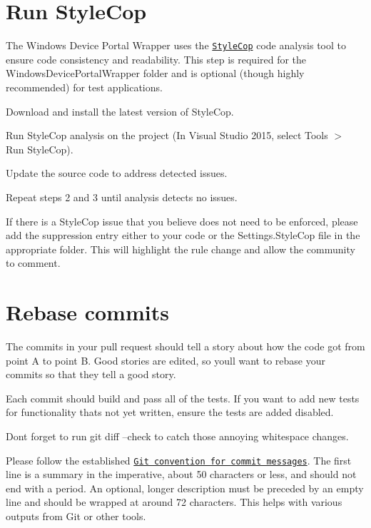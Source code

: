 \section*{Run Style\+Cop}

The Windows Device Portal Wrapper uses the \href{http://stylecop.codeplex.com}{\tt Style\+Cop} code analysis tool to ensure code consistency and readability. This step is required for the Windows\+Device\+Portal\+Wrapper folder and is optional (though highly recommended) for test applications.


\begin{DoxyEnumerate}
\item Download and install the latest version of Style\+Cop.
\item Run Style\+Cop analysis on the project (In Visual Studio 2015, select Tools $>$ Run Style\+Cop).
\item Update the source code to address detected issues.
\item Repeat steps 2 and 3 until analysis detects no issues.
\end{DoxyEnumerate}

If there is a Style\+Cop issue that you believe does not need to be enforced, please add the suppression entry either to your code or the Settings.\+Style\+Cop file in the appropriate folder. This will highlight the rule change and allow the community to comment.

\section*{Rebase commits}

The commits in your pull request should tell a story about how the code got from point A to point B. Good stories are edited, so you\textquotesingle{}ll want to rebase your commits so that they tell a good story.

Each commit should build and pass all of the tests. If you want to add new tests for functionality that\textquotesingle{}s not yet written, ensure the tests are added disabled.

Don\textquotesingle{}t forget to run git diff --check to catch those annoying whitespace changes.

Please follow the established \href{https://www.git-scm.com/book/en/v2/Distributed-Git-Contributing-to-a-Project#Commit-Guidelines}{\tt Git convention for commit messages}. The first line is a summary in the imperative, about 50 characters or less, and should not end with a period. An optional, longer description must be preceded by an empty line and should be wrapped at around 72 characters. This helps with various outputs from Git or other tools.

